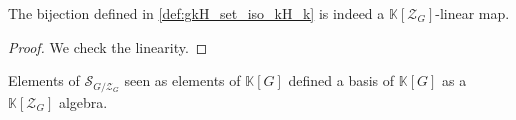 \begin{definition}
    \label{def:gkH_set_iso_kH_module}
    \leanok
    The bijection defined in \ref{def:gkH_set_iso_kH_k} is indeed a $\mathbb{K}[\mathcal{Z}_G]$-linear map.
    \begin{proof}    
        \leanok
        We check the linearity.
    \end{proof}
\end{definition}

\begin{proposition}
    \label{prop:MonoidAlgebra_MulAction_basis}
    \leanok
    Elements of $\mathcal{S}_{G/\mathcal{Z}_G}$ seen as elements of $\mathbb{K}[G]$ defined 
    a basis of $\mathbb{K}[G]$ as a $\mathbb{K}[\mathcal{Z}_G]$ algebra.
\end{proposition}

